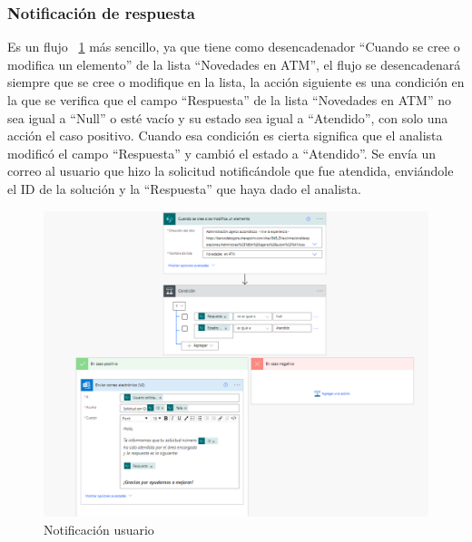 \subsubsection{Notificación de respuesta}
Es un flujo ~\ref{fig:not2} más sencillo, ya que tiene como desencadenador ``Cuando se cree o modifica un elemento'' de la lista ``Novedades en ATM'', el flujo se desencadenará siempre que se cree o modifique en la lista, la acción siguiente es una condición en la que se verifica que el campo ``Respuesta'' de la lista ``Novedades en ATM'' no sea igual a ``Null'' o esté vacío y su estado sea igual a ``Atendido'', con solo una acción el caso positivo.
Cuando esa condición es cierta significa que el analista modificó el campo ``Respuesta'' y cambió el estado a ``Atendido''. Se envía un correo al usuario que hizo la solicitud notificándole que fue atendida, enviándole el ID de la solución y la ``Respuesta'' que haya dado el analista.

\begin{figure}[H]
	\centering
	\includegraphics[scale=0.5]{Capitulo3/imagenes/flujo16.png}
	\caption{Notificación usuario}
	\label{fig:not2}
\end{figure}